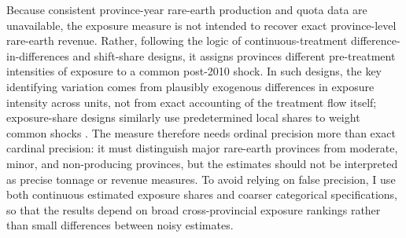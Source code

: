\documentclass[12pt]{article}
\begin{document}
Because consistent province-year rare-earth production and quota data are unavailable, the exposure measure is not intended to recover exact province-level rare-earth revenue. Rather, following the logic of continuous-treatment difference-in-differences and shift-share designs, it assigns provinces different pre-treatment intensities of exposure to a common post-2010 shock. In such designs, the key identifying variation comes from plausibly exogenous differences in exposure intensity across units, not from exact accounting of the treatment flow itself; exposure-share designs similarly use predetermined local shares to weight common shocks \parencite{callawayDifferenceinDifferencesContinuousTreatment}. The measure therefore needs ordinal precision more than exact cardinal precision: it must distinguish major rare-earth provinces from moderate, minor, and non-producing provinces, but the estimates should not be interpreted as precise tonnage or revenue measures. To avoid relying on false precision, I use both continuous estimated exposure shares and coarser categorical specifications, so that the results depend on broad cross-provincial exposure rankings rather than small differences between noisy estimates.


\newpage


\printbibliography
\end{document}

